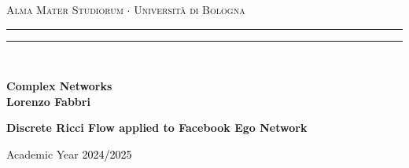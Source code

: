 
\begin{titlepage}
%
%
\begin{center}
{{\Large{\textsc{Alma Mater Studiorum $\cdot$ Universit\`a di Bologna}}}} 
\rule[0.1cm]{15.8cm}{0.1mm}
\rule[0.5cm]{15.8cm}{0.6mm}
\\\vspace{3mm}

{\small{\bf Complex Networks \\ \vspace{2mm}
Lorenzo Fabbri}}

\end{center}

\vspace*{\fill}

\begin{center}
{\LARGE{\bf Discrete Ricci Flow applied to Facebook Ego Network}\\
}\end{center}

\vspace*{\fill}

\vspace{50mm} \par \noindent

\begin{center}
%
Academic Year \textcolor{black}{2024/2025}
\end{center}

\end{titlepage}